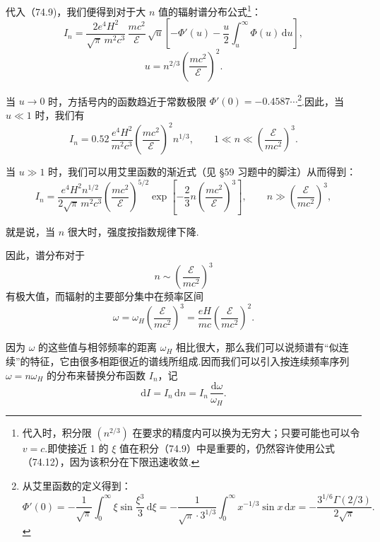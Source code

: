 代入（74.9)，我们便得到对于大 $n$ 值的辐射谱分布公式\footnote{代入时，积分限 $(n^{2/3})$ 在要求的精度内可以换为无穷大；只要可能也可以令 $v=c$.即使接近 1 的 $\xi$ 值在积分（74.9）中是重要的，仍然容许使用公式（74.12），因为该积分在下限迅速收敛.}：
\begin{equation}
  I_n=\frac{2e^4H^2}{\sqrt{\pi}\,m^2c^3}\,\frac{mc^2}{\mathcal{E}}\,\sqrt{u}
  \left[-\Phi'(u)-\frac{u}{2}\int_u^{\infty}\Phi(u)\,\mathrm{d}u\right],
\end{equation}
\begin{equation*}
  u=n^{2/3}\left(\frac{mc^2}{\mathcal{E}}\right)^{\!2}.
\end{equation*}

当 $u\to 0$ 时，方括号内的函数趋近于常数极限 $\Phi'(0)=-0.4587\cdots$\footnote{从艾里函数的定义得到：
\begin{equation*}
  \Phi'(0)=-\frac{1}{\sqrt{\pi}}\int_0^{\infty}\xi\sin\frac{\xi^3}{3}\,\mathrm{d}\xi
  =-\frac{1}{\sqrt{\pi}\cdot 3^{1/3}}\int_0^{\infty}x^{-1/3}\sin x\,\mathrm{d}x
  =-\frac{3^{1/6}\Gamma(2/3)}{2\sqrt{\pi}}.
\end{equation*}}.因此，当 $u\ll 1$ 时，我们有
\begin{equation}
  I_n=0.52\,\frac{e^4H^2}{m^2c^3}\left(\frac{mc^2}{\mathcal{E}}\right)^{\!2}n^{1/3},\qquad
  1\ll n\ll\left(\frac{\mathcal{E}}{mc^2}\right)^{\!3}.
\end{equation}

当 $u\gg 1$ 时，我们可以用艾里函数的渐近式（见 §59 习题中的脚注）从而得到：
\begin{equation}
  I_n=\frac{e^4H^2n^{1/2}}{2\sqrt{\pi}\,m^2c^3}\left(\frac{mc^2}{\mathcal{E}}\right)^{\!5/2}
  \exp\!\left[-\frac{2}{3}n\left(\frac{mc^2}{\mathcal{E}}\right)^{\!3}\right],\qquad
  n\gg\left(\frac{\mathcal{E}}{mc^2}\right)^{\!3},
\end{equation}

就是说，当 $n$ 很大时，强度按指数规律下降.

因此，谱分布对于
\begin{equation*}
  n\sim\left(\frac{\mathcal{E}}{mc^2}\right)^{\!3}
\end{equation*}
有极大值，而辐射的主要部分集中在频率区间
\begin{equation}
  \omega=\omega_H\left(\frac{\mathcal{E}}{mc^2}\right)^{\!3}
  =\frac{eH}{mc}\left(\frac{\mathcal{E}}{mc^2}\right)^{\!2}.
\end{equation}

因为 $\omega$ 的这些值与相邻频率的距离 $\omega_H$ 相比很大，那么我们可以说频谱有“似连续”的特征，它由很多相距很近的谱线所组成.因而我们可以引入按连续频率序列 $\omega=n\omega_H$ 的分布来替换分布函数 $I_n$，记
\begin{equation*}
  \mathrm{d}I=I_n\,\mathrm{d}n=I_n\,\frac{\mathrm{d}\omega}{\omega_H}.
\end{equation*}

